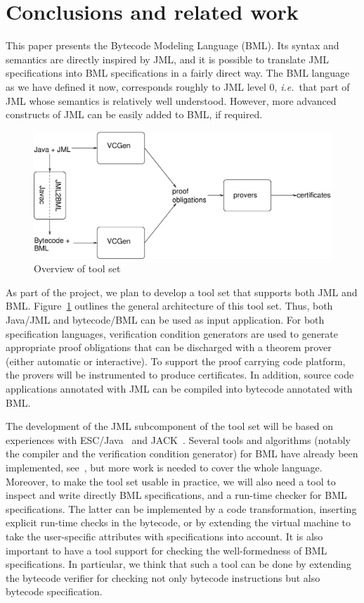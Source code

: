 \section{Conclusions and related work}\label{SecConcl}

This paper presents the Bytecode Modeling Language (BML). Its syntax
and semantics are directly inspired by JML, and it is possible to
translate JML specifications into BML specifications in a fairly
direct way. The BML language as we have defined it now, corresponds
roughly to JML level 0, \emph{i.e.}\ that part of JML whose semantics
is relatively well understood. However, more advanced constructs of
JML can be easily added to BML, if required. 

\begin{figure}[t]
\includegraphics[width=\textwidth]{toolset.eps} 
\caption{Overview of \mobius tool set}\label{FigToolSet}
\end{figure}
As part of the \mobius project, we plan to develop a tool set that
supports both JML and BML. Figure~\ref{FigToolSet} outlines the
general architecture of this tool set. Thus, both Java/JML and
bytecode/BML can be used as input application. For both specification
languages, verification condition generators are used to generate
appropriate proof obligations that can be discharged with a theorem
prover (either automatic or interactive). To support the proof
carrying code platform, the provers will be instrumented to produce
certificates. In addition, source code applications annotated with JML
can be compiled into bytecode annotated with BML.

The development of the JML subcomponent of the tool set will be based
on experiences with ESC/Java~\cite{CokK04} and JACK~\cite{BurdyRL03}.
Several tools and algorithms (notably the compiler and the
verification condition generator) for BML have already been
implemented, see~\cite{BurdyP06}, but more work is needed to cover the
whole language. Moreover, to make the tool set usable in practice, we
will also need a tool to inspect and write directly BML
specifications, and a run-time checker for BML specifications. The
latter can be implemented by a code transformation, inserting explicit
run-time checks in the bytecode, or by extending the virtual machine
to take the user-specific attributes with specifications into account.
It is also important to have a tool support for checking the well-formedness
of BML specifications. In particular, we think that such a tool 
can be done by extending the bytecode verifier for checking not
only bytecode instructions but also bytecode specification.

